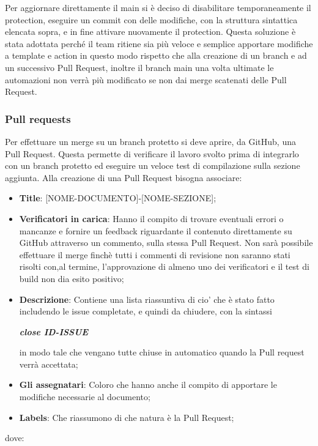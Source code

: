         Per aggiornare direttamente il main si è deciso di disabilitare temporaneamente
        il protection, eseguire un commit con delle modifiche, con la struttura sintattica elencata sopra, e in fine attivare nuovamente il protection.
        Questa soluzione è stata adottata perché il team ritiene sia più veloce e semplice apportare modifiche a template e action in questo modo
        rispetto che alla creazione di un branch e ad un successivo Pull Request, inoltre il branch main una volta ultimate le automazioni non verrà più modificato se non dai merge
        scatenati delle Pull Request.

        \subsubsection{Pull requests}\label{inf:pr}
        Per effettuare un merge su un branch protetto si deve aprire, da GitHub, una Pull Request. Questa
        permette di verificare il lavoro svolto prima di integrarlo con un branch protetto ed eseguire un veloce test di compilazione sulla sezione aggiunta.
        Alla creazione di una Pull Request bisogna associare:
        \begin{itemize}
            \item \textbf{Title}: [NOME-DOCUMENTO]-[NOME-SEZIONE];
            \item \textbf{Verificatori in carica}: Hanno il compito di trovare eventuali errori o mancanze e fornire un feedback
            riguardante il contenuto direttamente su GitHub attraverso un commento, sulla stessa Pull Request.
            Non sarà possibile effettuare il merge finchè tutti i commenti di revisione non saranno stati risolti
            con,al termine, l'approvazione di almeno uno dei verificatori e il test di build non dia esito positivo;
            \item \textbf{Descrizione}: Contiene una lista riassuntiva di cio' che è stato fatto includendo le issue completate, e quindi da chiudere,
            con la sintassi
            \begin{center}
                \textbf{\textit{close ID-ISSUE}}
            \end{center}
            in modo tale che vengano tutte chiuse in automatico quando la Pull request verrà accettata;
            \item \textbf{Gli assegnatari}: Coloro che hanno anche il compito di apportare le modifiche necessarie al documento;
            \item \textbf{Labels}: Che riassumono di che natura è la Pull Request;
        \end{itemize}
        dove:

